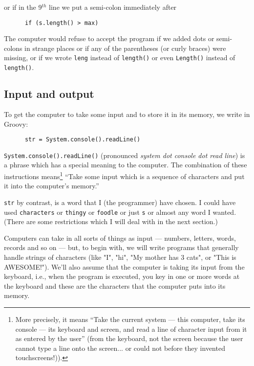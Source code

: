 or if in the 9$^{th}$ line we put a semi-colon immediately after 

\begin{Verbatim}
      if (s.length() > max)
\end{Verbatim}

The computer would refuse to accept the program if we added dots or semi-colons 
in strange places
or if any of the parentheses (or curly braces) were missing, or if we wrote
\verb!leng! instead of \verb!length()! or even \verb!Length()! instead of \verb!length()!.

% 

\subsection{Input and output}

To get the computer to take some input and to store it
in its memory, we write in Groovy:

\begin{Verbatim}
      str = System.console().readLine()
\end{Verbatim}

\verb!System.console().readLine()! (pronounced \emph{system dot
  console dot read line}) is a phrase which has a special meaning to
the computer. The combination of these instructions
means\footnote{More precisely, it means ``Take the current system
  --- this computer, take its console --- its keyboard and screen,
and read a line of character input from it as entered by the user'' (from the keyboard,
not the screen because the user cannot type a line onto the screen... or
could not before they invented touchscreens!)).} 
``Take some input which is a sequence of characters and put it into the computer's memory.''

\verb!str! by contrast, is a word that I (the programmer) have chosen.
I could have used \verb!characters! or \verb!thingy! or \verb!foodle!
or just \verb!s! or almost any word I wanted. (There are some
restrictions which I will deal with in the next section.)  

Computers can take in all sorts of things as input --- numbers,
letters, words, records and so on --- but, to begin with, we will
write programs that generally handle strings of characters (like
"I", "hi", "My mother has 3 cats", or "This is AWESOME!").
We'll also assume that the computer is taking its input from the
keyboard, i.e., when the program is executed, you key in one or more
words at the keyboard and these are the characters that the computer 
puts into its memory.

